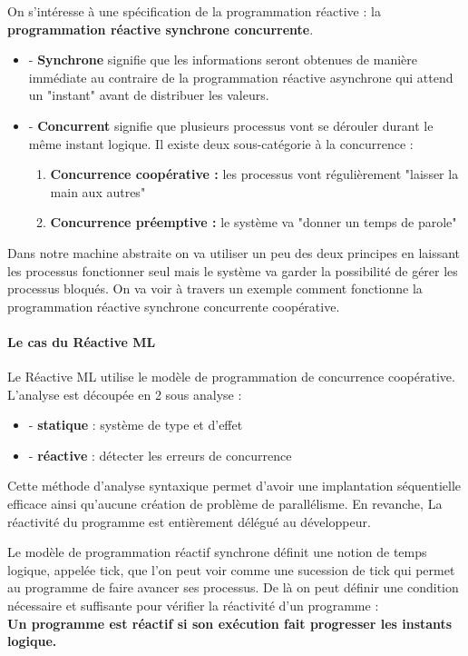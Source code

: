 \documentclass[10pt,a4paper]{report}
\begin{document}
On s'intéresse à une spécification de la programmation réactive : la \textbf{programmation réactive synchrone concurrente}.
\begin{itemize}
\item[] - \textbf{Synchrone} signifie que les informations seront obtenues de manière immédiate au contraire de la programmation réactive asynchrone qui attend un "instant" avant de distribuer les valeurs. 
\item[] - \textbf{Concurrent} signifie que plusieurs processus vont se dérouler durant le même instant logique. Il existe deux sous-catégorie à la concurrence :
  \begin{enumerate}
  \item \textbf{Concurrence coopérative :} les processus vont régulièrement "laisser la main aux autres"
  \item \textbf{Concurrence préemptive :} le système va "donner un temps de parole"
  \end{enumerate}
\end{itemize}
\smallbreak
Dans notre machine abstraite on va utiliser un peu des deux principes en laissant les processus fonctionner seul mais le système va garder la possibilité de gérer les processus bloqués. On va voir à travers un exemple comment fonctionne la programmation réactive synchrone concurrente coopérative.

\paragraph{Le cas du Réactive ML}
Le Réactive ML utilise le modèle de programmation de concurrence coopérative. 
\smallbreak
L'analyse est découpée en 2 sous analyse :
\begin{itemize}
\item[] - \textbf{statique} : système de type et d'effet
\item[] - \textbf{réactive} : détecter les erreurs de concurrence
\end{itemize}
\medbreak

Cette méthode d'analyse syntaxique permet d'avoir une implantation séquentielle efficace ainsi qu'aucune création de problème de parallélisme. En revanche, La réactivité du programme est entièrement délégué au développeur.
\medbreak

Le modèle de programmation réactif synchrone définit une notion de temps logique, appelée tick, que l'on peut voir comme une sucession de tick qui permet au programme de faire avancer ses processus. De là on peut définir une condition nécessaire et suffisante pour vérifier la réactivité d'un programme : 	
\\\textbf{Un programme est r\'{e}actif si son ex\'{e}cution fait progresser les instants logique.}
\medbreak
\end{document}
